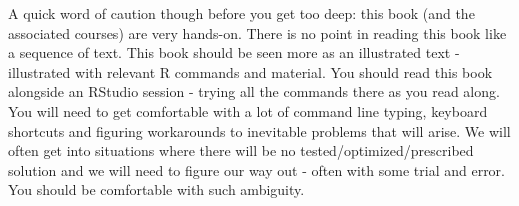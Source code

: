 A quick word of caution though before you get too deep: this book (and the associated courses) are very hands-on. There is no point in reading this book like a sequence of text. This book should be seen more as an illustrated text - illustrated with relevant R commands and material. You should read this book alongside an RStudio session - trying all the commands there as you read along. You will need to get comfortable with a lot of command line typing, keyboard shortcuts and figuring workarounds to inevitable problems that will arise. We will often get into situations where there will be no tested/optimized/prescribed solution and we will need to figure our way out - often with some trial and error. You should be comfortable with such ambiguity.

\chapterendsymbol
